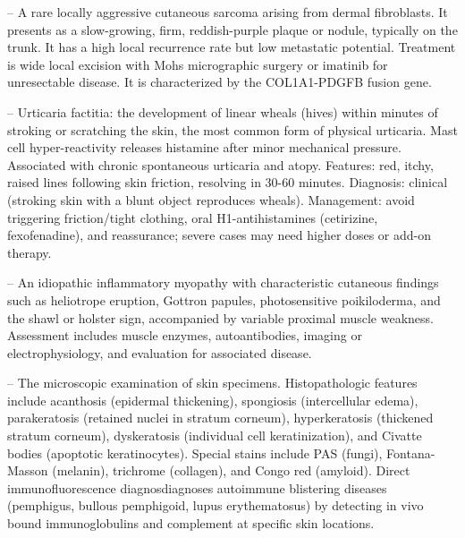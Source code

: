 -- A rare locally aggressive cutaneous sarcoma arising from dermal fibroblasts. It presents as a slow-growing, firm, reddish-purple plaque or nodule, typically on the trunk. It has a high local recurrence rate but low metastatic potential. Treatment is wide local excision with Mohs micrographic surgery or imatinib for unresectable disease. It is characterized by the COL1A1-PDGFB fusion gene.

-- Urticaria factitia: the development of linear wheals (hives) within minutes of stroking or scratching the skin, the most common form of physical urticaria. Mast cell hyper-reactivity releases histamine after minor mechanical pressure. Associated with chronic spontaneous urticaria and atopy. Features: red, itchy, raised lines following skin friction, resolving in 30-60 minutes. Diagnosis: clinical (stroking skin with a blunt object reproduces wheals). Management: avoid triggering friction/tight clothing, oral H1-antihistamines (cetirizine, fexofenadine), and reassurance; severe cases may need higher doses or add-on therapy.

-- An idiopathic inflammatory myopathy with characteristic cutaneous findings such as heliotrope eruption, Gottron papules, photosensitive poikiloderma, and the shawl or holster sign, accompanied by variable proximal muscle weakness. Assessment includes muscle enzymes, autoantibodies, imaging or electrophysiology, and evaluation for associated disease.

-- The microscopic examination of skin specimens. Histopathologic features include acanthosis (epidermal thickening), spongiosis (intercellular edema), parakeratosis (retained nuclei in stratum corneum), hyperkeratosis (thickened stratum corneum), dyskeratosis (individual cell keratinization), and Civatte bodies (apoptotic keratinocytes). Special stains include PAS (fungi), Fontana-Masson (melanin), trichrome (collagen), and Congo red (amyloid). Direct immunofluorescence diagnosdiagnoses autoimmune blistering diseases (pemphigus, bullous pemphigoid, lupus erythematosus) by detecting in vivo bound immunoglobulins and complement at specific skin locations.

